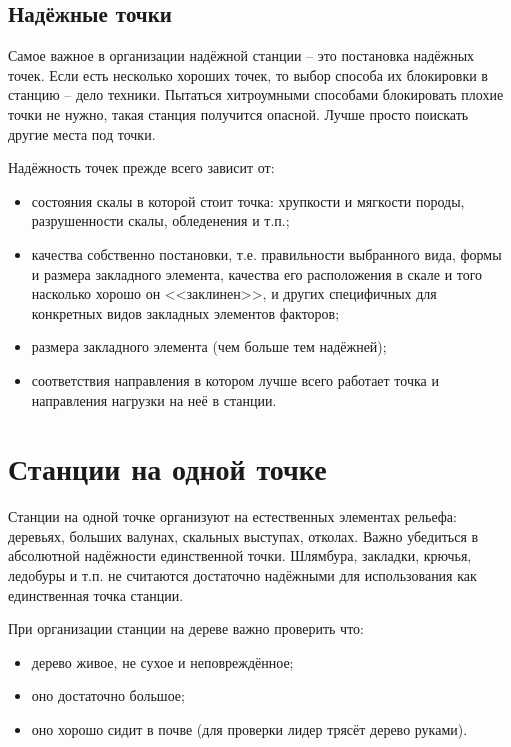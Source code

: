 \documentclass[fleqn, 12pt]{extarticle}
\begin{document}
\subsection{Надёжные точки}
    Самое важное в организации надёжной станции -- это постановка надёжных точек. Если есть несколько хороших точек, то выбор способа их блокировки в станцию -- дело техники.
    Пытаться хитроумными способами блокировать плохие точки не нужно, такая станция получится опасной. Лучше просто поискать другие места под точки.

    Надёжность точек прежде всего зависит от:
    \begin{itemize}
        \item состояния скалы в которой стоит точка: хрупкости и мягкости породы, разрушенности скалы, обледенения и т.п.;
        \item качества собственно постановки, т.е. правильности выбранного вида, формы и размера закладного элемента, качества его расположения в скале и
              того насколько хорошо он <<заклинен>>, и других специфичных для конкретных видов закладных элементов факторов;
        \item размера закладного элемента (чем больше тем надёжней);
        \item соответствия направления в котором лучше всего работает точка и направления нагрузки на неё в станции.
    \end{itemize}

\section{Станции на одной точке}
    Станции на одной точке организуют на естественных элементах рельефа: деревьях, больших валунах, скальных выступах, отколах. Важно убедиться в абсолютной надёжности единственной точки. 
    Шлямбура, закладки, крючья, ледобуры и т.п. не считаются достаточно надёжными для использования как единственная точка станции.

   	При организации станции на дереве важно проверить что:
    \begin{itemize}
        \item дерево живое, не сухое и неповреждённое;
        \item оно достаточно большое;
        \item оно хорошо сидит в почве (для проверки лидер трясёт дерево руками).
    \end{itemize}
    
\end{document}
